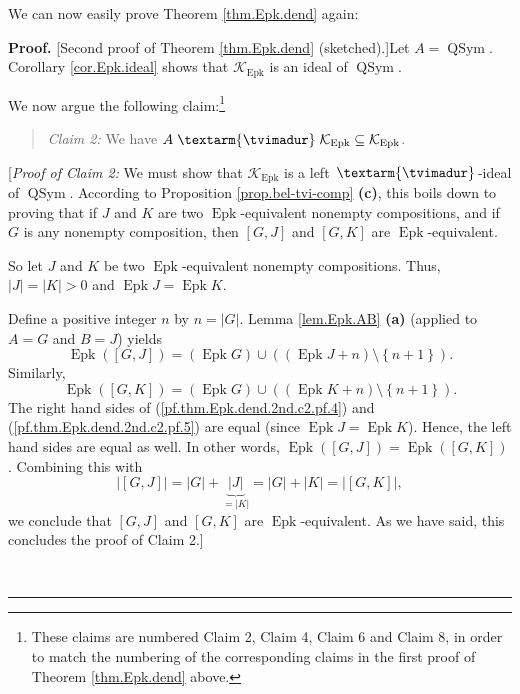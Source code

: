 \documentclass[numbers=enddot,12pt,final,onecolumn,notitlepage]{scrartcl}%
\theoremstyle{definition}
\newenvironment{statement}{\begin{quote}}{\end{quote}}
\newenvironment{proof}[1][Proof]{\noindent\textbf{#1.} }{\ \rule{0.5em}{0.5em}}
\newcommand{\tvi}{\left. \textarm{\tvimadur} \right.}
\begin{document}
We can now easily prove Theorem \ref{thm.Epk.dend} again:

\begin{proof}
[Second proof of Theorem \ref{thm.Epk.dend} (sketched).]Let
$A=\operatorname*{QSym}$. Corollary \ref{cor.Epk.ideal} shows that
$\mathcal{K}_{\operatorname*{Epk}}$ is an ideal of $\operatorname*{QSym}$.

We now argue the following claim:\footnote{These claims are numbered Claim 2,
Claim 4, Claim 6 and Claim 8, in order to match the numbering of the
corresponding claims in the first proof of Theorem \ref{thm.Epk.dend} above.}

\begin{statement}
\textit{Claim 2:} We have $A\tvi\mathcal{K}_{\operatorname*{Epk}}%
\subseteq\mathcal{K}_{\operatorname*{Epk}}$.
\end{statement}

[\textit{Proof of Claim 2:} We must show that $\mathcal{K}%
_{\operatorname*{Epk}}$ is a left $\tvi$-ideal of $\operatorname*{QSym}$.
According to Proposition \ref{prop.bel-tvi-comp} \textbf{(c)}, this boils down
to proving that if $J$ and $K$ are two $\operatorname*{Epk}$-equivalent
nonempty compositions, and if $G$ is any nonempty composition, then $\left[
G,J\right]  $ and $\left[  G,K\right]  $ are $\operatorname*{Epk}$-equivalent.

So let $J$ and $K$ be two $\operatorname*{Epk}$-equivalent nonempty
compositions. Thus, $\left\vert J\right\vert =\left\vert K\right\vert >0$ and
$\operatorname*{Epk}J=\operatorname*{Epk}K$.

Define a positive integer $n$ by $n=\left\vert G\right\vert $. Lemma
\ref{lem.Epk.AB} \textbf{(a)} (applied to $A=G$ and $B=J$) yields
\begin{equation}
\operatorname*{Epk}\left(  \left[  G,J\right]  \right)  =\left(
\operatorname*{Epk}G\right)  \cup\left(  \left(  \operatorname*{Epk}%
J+n\right)  \setminus\left\{  n+1\right\}  \right)  .
\label{pf.thm.Epk.dend.2nd.c2.pf.4}%
\end{equation}
Similarly,%
\begin{equation}
\operatorname*{Epk}\left(  \left[  G,K\right]  \right)  =\left(
\operatorname*{Epk}G\right)  \cup\left(  \left(  \operatorname*{Epk}%
K+n\right)  \setminus\left\{  n+1\right\}  \right)  .
\label{pf.thm.Epk.dend.2nd.c2.pf.5}%
\end{equation}
The right hand sides of (\ref{pf.thm.Epk.dend.2nd.c2.pf.4}) and
(\ref{pf.thm.Epk.dend.2nd.c2.pf.5}) are equal (since $\operatorname*{Epk}%
J=\operatorname*{Epk}K$). Hence, the left hand sides are equal as well. In
other words, $\operatorname*{Epk}\left(  \left[  G,J\right]  \right)
=\operatorname*{Epk}\left(  \left[  G,K\right]  \right)  $. Combining this
with%
\[
\left\vert \left[  G,J\right]  \right\vert =\left\vert G\right\vert
+\underbrace{\left\vert J\right\vert }_{=\left\vert K\right\vert }=\left\vert
G\right\vert +\left\vert K\right\vert =\left\vert \left[  G,K\right]
\right\vert ,
\]
we conclude that $\left[  G,J\right]  $ and $\left[  G,K\right]  $ are
$\operatorname*{Epk}$-equivalent. As we have said, this concludes the proof of
Claim 2.]


\end{proof}
\end{document}
